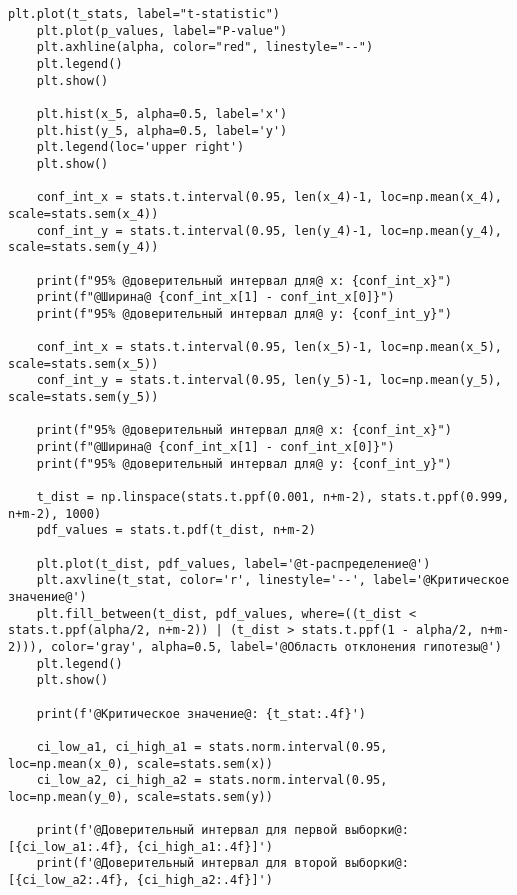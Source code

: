 \begin{lstlisting}[label=lst:1,caption=Проверка статистических гипотез для двух выборок]
	plt.plot(t_stats, label="t-statistic")
	plt.plot(p_values, label="P-value")
	plt.axhline(alpha, color="red", linestyle="--")
	plt.legend()
	plt.show()
	
	plt.hist(x_5, alpha=0.5, label='x')
	plt.hist(y_5, alpha=0.5, label='y')
	plt.legend(loc='upper right')
	plt.show()
	
	conf_int_x = stats.t.interval(0.95, len(x_4)-1, loc=np.mean(x_4), scale=stats.sem(x_4))
	conf_int_y = stats.t.interval(0.95, len(y_4)-1, loc=np.mean(y_4), scale=stats.sem(y_4))
	
	print(f"95% @доверительный интервал для@ x: {conf_int_x}")
	print(f"@Ширина@ {conf_int_x[1] - conf_int_x[0]}")
	print(f"95% @доверительный интервал для@ y: {conf_int_y}")
	
	conf_int_x = stats.t.interval(0.95, len(x_5)-1, loc=np.mean(x_5), scale=stats.sem(x_5))
	conf_int_y = stats.t.interval(0.95, len(y_5)-1, loc=np.mean(y_5), scale=stats.sem(y_5))
	
	print(f"95% @доверительный интервал для@ x: {conf_int_x}")
	print(f"@Ширина@ {conf_int_x[1] - conf_int_x[0]}")
	print(f"95% @доверительный интервал для@ y: {conf_int_y}")
	
	t_dist = np.linspace(stats.t.ppf(0.001, n+m-2), stats.t.ppf(0.999, n+m-2), 1000)
	pdf_values = stats.t.pdf(t_dist, n+m-2)
	
	plt.plot(t_dist, pdf_values, label='@t-распределение@')
	plt.axvline(t_stat, color='r', linestyle='--', label='@Критическое значение@')
	plt.fill_between(t_dist, pdf_values, where=((t_dist < stats.t.ppf(alpha/2, n+m-2)) | (t_dist > stats.t.ppf(1 - alpha/2, n+m-2))), color='gray', alpha=0.5, label='@Область отклонения гипотезы@')
	plt.legend()
	plt.show()
	
	print(f'@Критическое значение@: {t_stat:.4f}')
	
	ci_low_a1, ci_high_a1 = stats.norm.interval(0.95, loc=np.mean(x_0), scale=stats.sem(x))
	ci_low_a2, ci_high_a2 = stats.norm.interval(0.95, loc=np.mean(y_0), scale=stats.sem(y))
	
	print(f'@Доверительный интервал для первой выборки@: [{ci_low_a1:.4f}, {ci_high_a1:.4f}]')
	print(f'@Доверительный интервал для второй выборки@: [{ci_low_a2:.4f}, {ci_high_a2:.4f}]')
\end{lstlisting}

\clearpage
